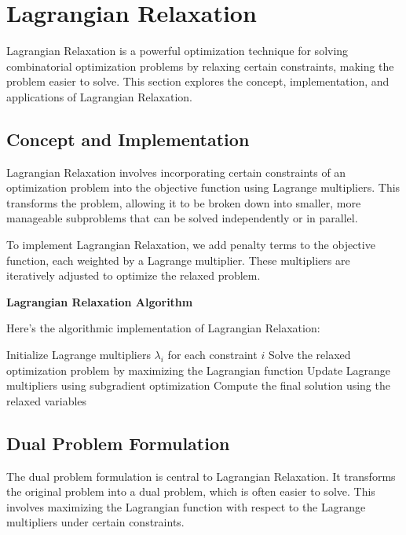 \documentclass[12pt]{book} %
\begin{document}
\section{Lagrangian Relaxation}

Lagrangian Relaxation is a powerful optimization technique for solving combinatorial optimization problems by relaxing certain constraints, making the problem easier to solve. This section explores the concept, implementation, and applications of Lagrangian Relaxation.

\subsection{Concept and Implementation}

Lagrangian Relaxation involves incorporating certain constraints of an optimization problem into the objective function using Lagrange multipliers. This transforms the problem, allowing it to be broken down into smaller, more manageable subproblems that can be solved independently or in parallel.

To implement Lagrangian Relaxation, we add penalty terms to the objective function, each weighted by a Lagrange multiplier. These multipliers are iteratively adjusted to optimize the relaxed problem.

\textbf{Lagrangian Relaxation Algorithm}

Here's the algorithmic implementation of Lagrangian Relaxation:
\FloatBarrier
\begin{algorithm}[H]
\caption{Lagrangian Relaxation}
\begin{algorithmic}[1]
\State Initialize Lagrange multipliers $\lambda_i$ for each constraint $i$
    \State Solve the relaxed optimization problem by maximizing the Lagrangian function
    \State Update Lagrange multipliers using subgradient optimization
\EndWhile
\State Compute the final solution using the relaxed variables
\end{algorithmic}
\end{algorithm}
\FloatBarrier

\subsection{Dual Problem Formulation}

The dual problem formulation is central to Lagrangian Relaxation. It transforms the original problem into a dual problem, which is often easier to solve. This involves maximizing the Lagrangian function with respect to the Lagrange multipliers under certain constraints.
\end{document}
